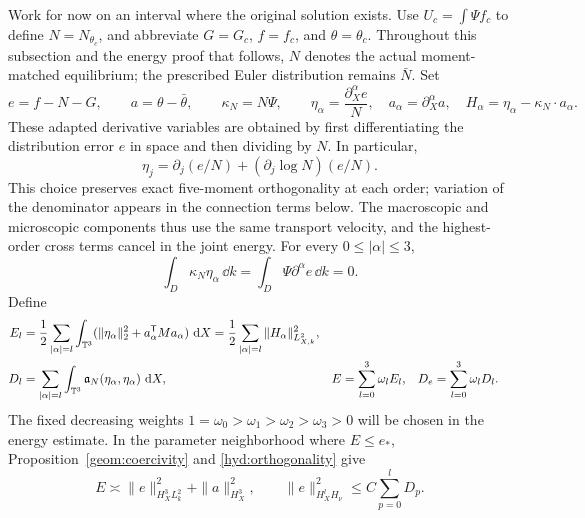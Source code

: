Work for now on an interval where the original solution exists. Use
$U_c=\int\Psi f_c$ to define $N=N_{\theta_c}$, and abbreviate
$G=G_c$, $f=f_c$, and $\theta=\theta_c$.
Throughout this subsection and the energy proof that follows, $N$
denotes the actual moment-matched equilibrium; the prescribed Euler
distribution remains $\bar N$. Set
\[
 e=f-N-G,\qquad a=\theta-\bar\theta,\qquad \kappa_N=N\Psi,
 \qquad \eta_\alpha=\frac{\partial_X^\alpha e}{N},
 \quad a_\alpha=\partial_X^\alpha a,
 \quad H_\alpha=\eta_\alpha-\kappa_N\cdot a_\alpha.
\]
These adapted derivative variables are obtained by first differentiating
the distribution error $e$ in space and then dividing by $N$.
In particular,
\[
 \eta_j=\partial_j(e/N)+(\partial_j\log N)(e/N).
\]
This choice preserves exact five-moment orthogonality at each order;
variation of the denominator appears in the connection terms below.
The macroscopic and microscopic components thus use the same transport
velocity, and the highest-order cross terms cancel in the joint energy.
For every $0\le|\alpha|\le3$,
\begin{equation}\label{hyd:orthogonality}
 \int_D\kappa_N\eta_\alpha\,\dd k
       =\int_D\Psi\partial^\alpha e\,\dd k=0.
\end{equation}
Define
\begin{align}
 E_l&=\frac12\sum_{|\alpha|=l}\int_{\mathbb T^3}
       (\|\eta_\alpha\|_2^2+a_\alpha^{\mathsf T}Ma_\alpha)\,\,\mathrm d X
     =\frac12\sum_{|\alpha|=l}\|H_\alpha\|_{L^2_{X,k}}^2,
       \label{hyd:E-l}\\
 D_l&=\sum_{|\alpha|=l}\int_{\mathbb T^3}
                 \mathfrak a_N(\eta_\alpha,\eta_\alpha)\,\,\mathrm d X,
 &E&=\sum_{l=0}^3\omega_lE_l,
 &D_e&=\sum_{l=0}^3\omega_lD_l.\label{hyd:D-l}
\end{align}
The fixed decreasing weights
$1=\omega_0>\omega_1>\omega_2>\omega_3>0$ will be chosen in the energy
estimate. In the parameter neighborhood where $E\le e_*$,
Proposition~\ref{geom:coercivity} and \eqref{hyd:orthogonality} give
\begin{equation}\label{hyd:energy-equivalence}
 E\asymp\|e\|_{H_X^3L_k^2}^2+\|a\|_{H_X^3}^2,
 \qquad \|e\|_{H_X^lH_\nu}^2\le C\sum_{p=0}^lD_p.
\end{equation}

